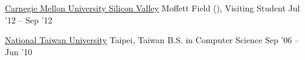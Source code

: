 \documentclass[10pt, a4paper]{article} %
\begin{document}
\headedsection %
{\href{http://www.cmu.edu/silicon-valley/}{Carnegie Mellon University Silicon Valley}}
{Moffett Field (), }
{\headedsubsection %
	{Visiting Student}
	{Jul '12 -- Sep '12} 
	{}
}

\headedsection %
{\href{http://www.ntu.edu.tw}{National Taiwan University}}
{Taipei, Taiwan}
{\headedsubsection %
	{B.S. in Computer Science}
	{Sep '06 -- Jun '10} 
	{\bodytext{}}
}

\spacedhrule{0.5em}{-1em} %


\end{document}
